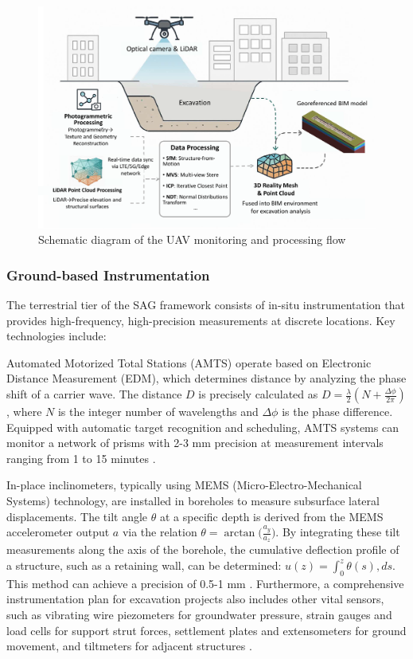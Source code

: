 \documentclass[preprint,11pt,authoryear,3p]{elsarticle}
\begin{document}
\begin{figure}[htbp]
\centering
\includegraphics[width=\textwidth]{imgs/UAV_Structure.pdf}
\caption{Schematic diagram of the UAV monitoring and processing flow}
\label{fig:UAV_Structure}
\end{figure}

\subsubsection{Ground-based Instrumentation}

The terrestrial tier of the SAG framework consists of in-situ instrumentation that provides high-frequency, high-precision measurements at discrete locations. Key technologies include:

Automated Motorized Total Stations (AMTS) operate based on Electronic Distance Measurement (EDM), which determines distance by analyzing the phase shift of a carrier wave. The distance $D$ is precisely calculated as $D = \frac{\lambda}{2}\left ( N + \frac{\Delta\phi}{2\pi} \right )$, where $N$ is the integer number of wavelengths and $\Delta\phi$ is the phase difference. Equipped with automatic target recognition and scheduling, AMTS systems can monitor a network of prisms with 2-3 mm precision at measurement intervals ranging from 1 to 15 minutes \citep{PARTSINEVELOS2024105216}.

In-place inclinometers, typically using MEMS (Micro-Electro-Mechanical Systems) technology, are installed in boreholes to measure subsurface lateral displacements. The tilt angle $\theta$ at a specific depth is derived from the MEMS accelerometer output $a$ via the relation $\theta = \arctan \big(\tfrac{a_y}{a_z}\big)$. By integrating these tilt measurements along the axis of the borehole, the cumulative deflection profile of a structure, such as a retaining wall, can be determined: $u(z) = \int_0^z \theta(s),ds$. This method can achieve a precision of 0.5-1 mm \citep{ZENG2024117520}. Furthermore, a comprehensive instrumentation plan for excavation projects also includes other vital sensors, such as vibrating wire piezometers for groundwater pressure, strain gauges and load cells for support strut forces, settlement plates and extensometers for ground movement, and tiltmeters for adjacent structures \citep{XU2024105495,LI2024107772}.
\end{document}
